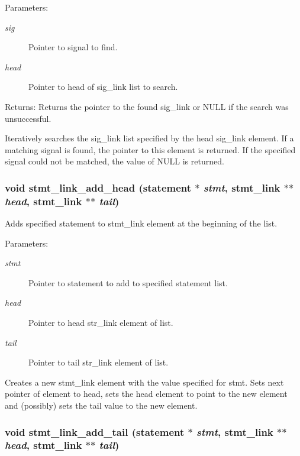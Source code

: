 \begin{Desc}
\item[Parameters:]
\begin{description}
\item[{\em sig}]Pointer to signal to find. \item[{\em head}]Pointer to head of sig\_\-link list to search. \end{description}
\end{Desc}
\begin{Desc}
\item[Returns:]Returns the pointer to the found sig\_\-link or NULL if the search was unsuccessful.\end{Desc}
Iteratively searches the sig\_\-link list specified by the head sig\_\-link element. If a matching signal is found, the pointer to this element is returned. If the specified signal could not be matched, the value of NULL is returned. 
\subsubsection{\setlength{\rightskip}{0pt plus 5cm}void stmt\_\-link\_\-add\_\-head ({\bf statement} $\ast$ {\em stmt}, {\bf stmt\_\-link} $\ast$$\ast$ {\em head}, {\bf stmt\_\-link} $\ast$$\ast$ {\em tail})}\label{link_8h_a1}


Adds specified statement to stmt\_\-link element at the beginning of the list. 

\begin{Desc}
\item[Parameters:]
\begin{description}
\item[{\em stmt}]Pointer to statement to add to specified statement list. \item[{\em head}]Pointer to head str\_\-link element of list. \item[{\em tail}]Pointer to tail str\_\-link element of list.\end{description}
\end{Desc}
Creates a new stmt\_\-link element with the value specified for stmt. Sets next pointer of element to head, sets the head element to point to the new element and (possibly) sets the tail value to the new element. 
\subsubsection{\setlength{\rightskip}{0pt plus 5cm}void stmt\_\-link\_\-add\_\-tail ({\bf statement} $\ast$ {\em stmt}, {\bf stmt\_\-link} $\ast$$\ast$ {\em head}, {\bf stmt\_\-link} $\ast$$\ast$ {\em tail})}\label{link_8h_a2}


